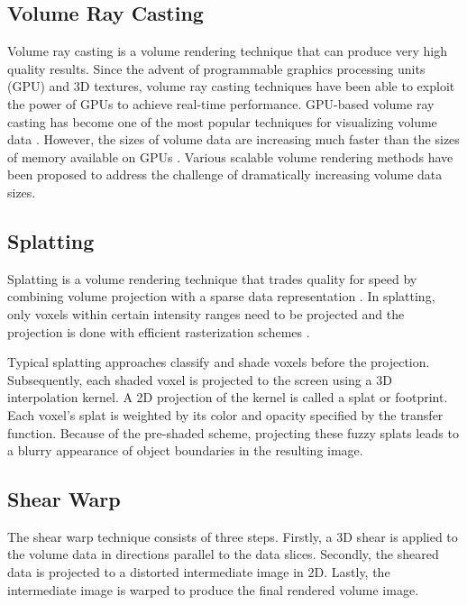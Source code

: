 \subsection{Volume Ray Casting}
Volume ray casting is a volume rendering technique that can produce very high quality results.
Since the advent of programmable graphics processing units (GPU) and 3D textures, volume ray casting techniques have been able to exploit the power of GPUs to achieve real-time performance.
GPU-based volume ray casting has become one of the most popular techniques for visualizing volume data \cite{meyer-spradow_voreen:_2009}.
However, the sizes of volume data are increasing much faster than the sizes of memory available on GPUs \cite{beyer_state---art_2015}. Various scalable volume rendering methods \cite{engel_cera-tvr:_2011} \cite{fogal_analysis_2013} have been proposed to address the challenge of dramatically increasing volume data sizes.


\subsection{Splatting}
Splatting is a volume rendering technique that trades quality for speed by combining volume projection with a sparse data representation \cite{westover_splatting:_1991}. In splatting, only voxels within certain intensity ranges need to be projected and the projection is done with efficient rasterization schemes \cite{mueller_splatting_1999}.

Typical splatting approaches classify and shade voxels before the projection. Subsequently, each shaded voxel is projected to the screen using a 3D interpolation kernel. A 2D projection of the kernel is called a splat or footprint.
Each voxel's splat is weighted by its color and opacity specified by the transfer function.
Because of the pre-shaded scheme, projecting these fuzzy splats leads to a blurry appearance of object boundaries in the resulting image.

\subsection{Shear Warp}
The shear warp technique \cite{lacroute_fast_1994} consists of three steps.
Firstly, a 3D shear is applied to the volume data in directions parallel to the data slices. Secondly, the sheared data is projected to a distorted intermediate image in 2D. Lastly, the intermediate image is warped to produce the final rendered volume image.

